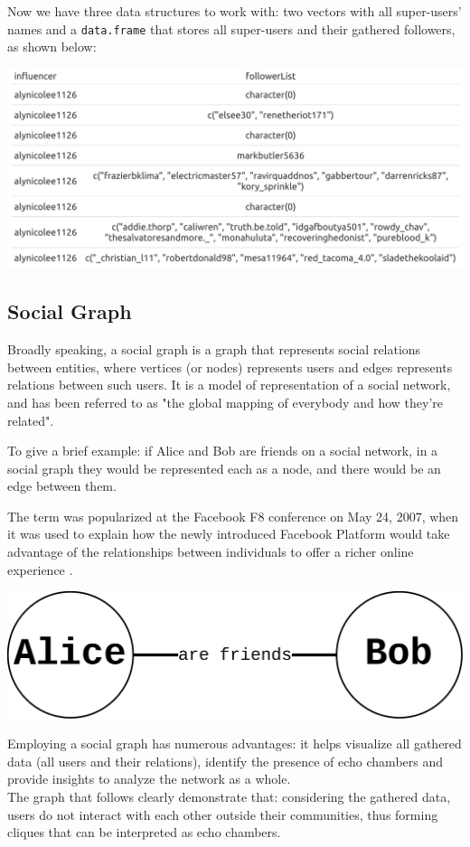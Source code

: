 Now we have three data structures to work with: two vectors with all super-users' names and a \verb+data.frame+ that stores all super-users and their gathered followers, as shown below:

\aCapo{}
\includegraphics[width = .48\textwidth]{images/total_table_p23.png}

\subsection{Social Graph}

Broadly speaking, a social graph is a graph that represents social relations between entities, where vertices (or nodes) represents users and edges represents relations between such users. It is a model of representation of a social network, and has been referred to as "the global mapping of everybody and how they're related".

To give a brief example: if Alice and Bob are friends on a social network, in a social graph they would be represented each as a node, and there would be an edge between them.

The term was popularized at the Facebook F8 conference on May 24, 2007, when it was used to explain how the newly introduced Facebook Platform would take advantage of the relationships between individuals to offer a richer online experience \cite{wikiSAN}.

\aCapo{}
\includegraphics[width = .5\textwidth]{images/alice_bob_san.png}

Employing a social graph has numerous advantages: it helps visualize all gathered data (all users and their relations), identify the presence of echo chambers and provide insights to analyze the network as a whole. \\
The graph that follows clearly demonstrate that: considering the gathered data, users do not interact with each other outside their communities, thus forming cliques that can be interpreted as echo chambers.


